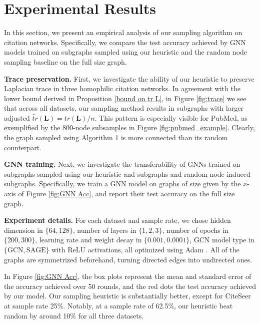 \documentclass[conference]{IEEEtran}
\theoremstyle{definition}
\begin{document}
\section{Experimental Results}

In this section, we present an empirical analysis of our sampling algorithm on citation networks. Specifically, we compare the test accuracy achieved by GNN models trained on subgraphs sampled using our heuristic and the random node sampling baseline on the full size graph. 

\noindent \textbf{Trace preservation.} %
First, we investigate the ability of our heuristic to preserve Laplacian trace in three homophilic citation networks. In agreement with the lower bound derived in Proposition \ref{bound on tr L}, in Figure \ref{fig:trace} we see that across all datasets, our sampling method results in subgraphs with larger adjusted $\tilde{{tr}}(\textbf{L}) = {tr}(\mathbf{L}) / n$. This pattern is especially visible for PubMed, as exemplified by the 800-node subsamples in Figure \ref{fig:pubmed_example}. Clearly, the graph sampled using Algorithm 1 is more connected than its random counterpart.

\noindent \textbf{GNN training.} Next, we investigate the transferability of GNNs trained on subgraphs sampled using our heuristic and subgraphs and random node-induced subgraphs. Specifically, we train a GNN model on graphs of size given by the $x$-axis of Figure \ref{fig:GNN Acc}, and report their test accuracy on the full size graph. 

\noindent \textbf{Experiment details.} For each dataset and sample rate, we chose hidden dimension in $\{64, 128\}$, number of layers in $\{1,2,3\}$, number of epochs in $\{200, 300\}$, learning rate and weight decay in $\{0.001, 0.0001\}$, GCN model type in $\{\text{GCN}, \text{SAGE}\}$ with ReLU activations, all optimized using Adam \cite{kingma17-adam}. All of the graphs are symmetrized beforehand, turning directed edges into undirected ones. 

In Figure \ref{fig:GNN Acc}, the box plots represent the mean and standard error of the accuracy achieved over 50 rounds, and the red dots the test accuracy achieved by our model.  Our sampling heuristic is substantially better, except for CiteSeer at sample rate 25\%. Notably, at a sample rate of 62.5\%, our heuristic beat random by around 10\% for all three datasets.
\end{document}
